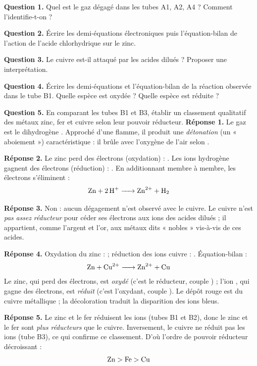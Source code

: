 \documentclass[11pt]{article}
\newcommand{\cle}[1]{{\popxbold\color{popdark}#1}}
\begin{document}
\begin{exoresolu}
\textbf{Question 1.} Quel est le gaz dégagé dans les tubes A1, A2, A4 ? Comment l'identifie-t-on ?

\textbf{Question 2.} Écrire les demi-équations électroniques puis l'équation-bilan de l'action de l'acide chlorhydrique sur le zinc.

\textbf{Question 3.} Le cuivre est-il attaqué par les acides dilués ? Proposer une interprétation.

\textbf{Question 4.} Écrire les demi-équations et l'équation-bilan de la réaction observée dans le tube B1. Quelle espèce est oxydée ? Quelle espèce est réduite ?

\textbf{Question 5.} En comparant les tubes B1 et B3, établir un classement qualitatif des métaux zinc, fer et cuivre selon leur pouvoir réducteur.
\tcblower
\textbf{Réponse 1.} Le gaz est le \cle{dihydrogène} . Approché d'une flamme, il produit une \emph{détonation} (un « aboiement ») caractéristique : il brûle avec l'oxygène de l'air selon .

\textbf{Réponse 2.} Le zinc perd des électrons (oxydation) : . Les ions hydrogène gagnent des électrons (réduction) : . En additionnant membre à membre, les électrons s'éliminent :
\[ \ce{Zn + 2H+ -> Zn^2+ + H2} \]

\textbf{Réponse 3.} Non : aucun dégagement n'est observé avec le cuivre. Le cuivre n'est \emph{pas assez réducteur} pour céder ses électrons aux ions  des acides dilués ; il appartient, comme l'argent et l'or, aux métaux dits « nobles » vis-à-vis de ces acides.

\textbf{Réponse 4.} Oxydation du zinc :  ; réduction des ions cuivre : . Équation-bilan :
\[ \ce{Zn + Cu^2+ -> Zn^2+ + Cu} \]
Le zinc, qui perd des électrons, est \emph{oxydé} (c'est le réducteur, couple ) ; l'ion , qui gagne des électrons, est \emph{réduit} (c'est l'oxydant, couple ). Le dépôt rouge est du cuivre métallique ; la décoloration traduit la disparition des ions  bleus.

\textbf{Réponse 5.} Le zinc et le fer réduisent les ions  (tubes B1 et B2), donc le zinc et le fer sont \emph{plus réducteurs} que le cuivre. Inversement, le cuivre ne réduit pas les ions  (tube B3), ce qui confirme ce classement. D'où l'ordre de pouvoir réducteur décroissant :
\[ \ce{Zn} > \ce{Fe} > \ce{Cu} \]
\end{exoresolu}
\end{document}

